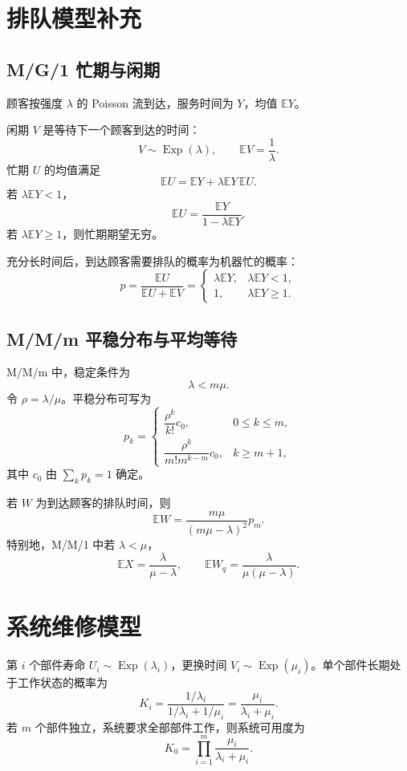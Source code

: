 \documentclass[12pt,a4paper,openany]{ctexrep}
\theoremstyle{definition}
\newcommand{\E}{\mathbb{E}}
\newcommand{\Exp}{\operatorname{Exp}}
\begin{document}
\section{排队模型补充}

\subsection{M/G/1 忙期与闲期}

顾客按强度 $\lambda$ 的 Poisson 流到达，服务时间为 $Y$，均值 $\E Y$。

闲期 $V$ 是等待下一个顾客到达的时间：
\[
V\sim\Exp(\lambda),\qquad \E V=\frac1\lambda.
\]
忙期 $U$ 的均值满足
\[
\E U=\E Y+\lambda\E Y\,\E U.
\]
若 $\lambda\E Y<1$，
\[
\E U=\frac{\E Y}{1-\lambda\E Y}.
\]
若 $\lambda\E Y\ge1$，则忙期期望无穷。

充分长时间后，到达顾客需要排队的概率为机器忙的概率：
\[
p=\frac{\E U}{\E U+\E V}
=
\begin{cases}
\lambda\E Y,&\lambda\E Y<1,\\
1,&\lambda\E Y\ge1.
\end{cases}
\]

\subsection{M/M/m 平稳分布与平均等待}

M/M/m 中，稳定条件为
\[
\lambda<m\mu.
\]
令 $\rho=\lambda/\mu$。平稳分布可写为
\[
p_k=
\begin{cases}
\dfrac{\rho^k}{k!}c_0,&0\le k\le m,\\[1ex]
\dfrac{\rho^k}{m!m^{k-m}}c_0,&k\ge m+1,
\end{cases}
\]
其中 $c_0$ 由 $\sum_kp_k=1$ 确定。

若 $W$ 为到达顾客的排队时间，则
\[
\E W=\frac{m\mu}{(m\mu-\lambda)^2}p_m.
\]
特别地，M/M/1 中若 $\lambda<\mu$，
\[
\E X=\frac{\lambda}{\mu-\lambda},
\qquad
\E W_q=\frac{\lambda}{\mu(\mu-\lambda)}.
\]

\section{系统维修模型}

第 $i$ 个部件寿命 $U_i\sim\Exp(\lambda_i)$，更换时间 $V_i\sim\Exp(\mu_i)$。单个部件长期处于工作状态的概率为
\[
K_i=\frac{1/\lambda_i}{1/\lambda_i+1/\mu_i}
=
\frac{\mu_i}{\lambda_i+\mu_i}.
\]
若 $m$ 个部件独立，系统要求全部部件工作，则系统可用度为
\[
K_0=\prod_{i=1}^m\frac{\mu_i}{\lambda_i+\mu_i}.
\]
\end{document}

